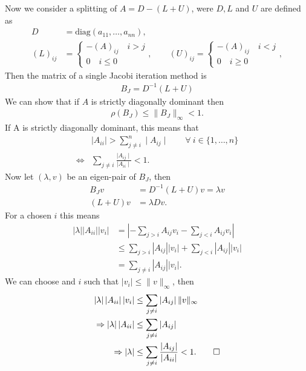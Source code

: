 \subsubsection{}
Now we consider a splitting of $A = D - (L + U)$, were $D, L$ and $U$ are
defined as
\begin{align}
    D &= \text{diag}\left(a_{11},\ldots,a_{nn}\right), \\
    \left(L \right)_{ij} &=
    \begin{cases}
        -\left( A \right)_{ij}\quad i > j\\
        0 \quad i\leq 0
    \end{cases},
    \qquad
    \left(U \right)_{ij} =
    \begin{cases}
        -\left( A \right)_{ij}\quad i < j\\
        0 \quad i \ge 0
    \end{cases},
\end{align}
Then the matrix of a single Jacobi iteration method is
\begin{align}
    B_J = D^{-1}(L+U)
\end{align}
We can show that if $A$ is strictly diagonally dominant then
\begin{align}
    \rho(B_J) \le \|B_J\|_\infty < 1.
\end{align}
If A is strictly diagonally dominant, this means that
\begin{align}
    &\mid A_{ii}\mid > \sum_{j\neq i}^{n}  \mid A_{ij} \mid \qquad \forall\
     i\in\{1, \ldots , n\} \\
    \Leftrightarrow &\sum_{j\neq i} \frac{ \mid A_{ij} \mid}{ \mid A_{ii}  \mid}
     < 1.
\end{align}
Now let $(\lambda, v)$ be an eigen-pair of $B_J$, then
\begin{align}
    B_J v &= D^{-1}(L+U)v = \lambda v\\
    (L+U)v &= \lambda D v.
\end{align}
For a chosen $i$ this means
\begin{align}
    \left| \lambda \right| \left| A_{ii} \right| \left| v_i \right|
    &=
    \left|
    -\sum_{j>i} A_{ij}v_i - \sum_{j<i} A_{ij}v_i
    \right|\\
    &\le \sum_{j>i}
    \left|A_{ij} \right| \left| v_i \right| + \sum_{j<i}
    \left|A_{ij} \right| \left| v_i \right|\\
    &= \sum_{j\neq i} \left| A_{ij} \right| \left|v_i\right|.
\end{align}
We can choose and $i$ such that $\left| v_i \right| \le \|v\|_\infty$, then
\begin{align}
    \left| \lambda \right| \left| A_{ii} \right| \left| v_i \right|
    &\le \sum_{j\neq i} \left| A_{ij} \right| \|v\|_\infty\\
    \Rightarrow
    \left| \lambda \right| \left| A_{ii} \right|
    &\le \sum_{j\neq i} \left| A_{ij} \right|\\
    \Rightarrow
    \left| \lambda \right|
    &\le \sum_{j\neq i}\frac{\left| A_{ij} \right|}{\left| A_{ii} \right|} <
    1. \qed
\end{align}
